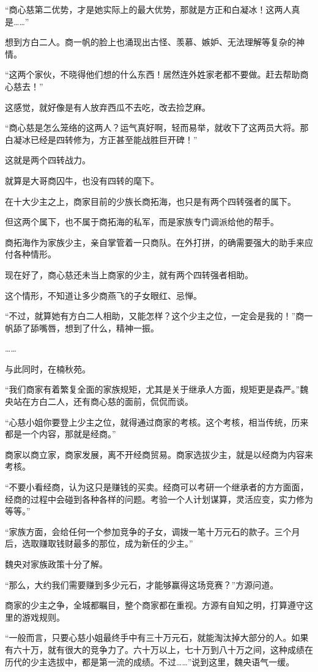 \begin{this_body}
“商心慈第二优势，才是她实际上的最大优势，那就是方正和白凝冰！这两人真是……”

想到方白二人。商一帆的脸上也涌现出古怪、羡慕、嫉妒、无法理解等复杂的神情。

“这两个家伙，不晓得他们想的什么东西！居然连外姓家老都不要做。赶去帮助商心慈去！”

这感觉，就好像是有人放弃西瓜不去吃，改去捡芝麻。

“商心慈是怎么笼络的这两人？运气真好啊，轻而易举，就收下了这两员大将。那白凝冰已经是四转修为，方正甚至能战胜巨开碑！”

这就是两个四转战力。

就算是大哥商囚牛，也没有四转的麾下。

在十大少主之上，商家目前的少族长商拓海，也只是有两个四转强者的属下。

但这两个属下，也不属于商拓海的私军，而是家族专门调派给他的帮手。

商拓海作为家族少主，亲自掌管着一只商队。在外打拼，的确需要强大的助手来应付各种情形。

现在好了，商心慈还未当上商家的少主，就有两个四转强者相助。

这个情形，不知道让多少商燕飞的子女眼红、忌惮。

“不过，就算她有方白二人相助，又能怎样？这个少主之位，一定会是我的！”商一帆舔了舔嘴唇，想到了什么，精神一振。

……

与此同时，在楠秋苑。

“我们商家有着繁复全面的家族规矩，尤其是关于继承人方面，规矩更是森严。”魏央站在方白二人，还有商心慈的面前，侃侃而谈。

“心慈小姐你要登上少主之位，就得通过商家的考核。这个考核，相当传统，历来都是一个内容，那就是经商。”

商家以商立家，商家发展，离不开经商贸易。商家选拔少主，就是以经商为内容来考核。

“不要小看经商，认为这只是赚钱的买卖。经商可以考研一个继承者的方方面面，经商的过程中会碰到各种各样的问题。考验一个人计划谋算，灵活应变，实力修为等等。”

“家族方面，会给任何一个参加竞争的子女，调拨一笔十万元石的款子。三个月后，选取赚取钱财最多的那位，成为新任的少主。”

魏央对家族政策十分了解。

“那么，大约我们需要赚到多少元石，才能够赢得这场竞赛？”方源问道。

商家的少主之争，全城都瞩目，整个商家都在重视。方源有自知之明，打算遵守这里的游戏规则。

“一般而言，只要心慈小姐最终手中有三十万元石，就能淘汰掉大部分的人。如果有六十万，就有很大的竞争力了。六十万以上，七十万到八十万之间，这种成绩在历代的少主选拔中，都是第一流的成绩。不过……”说到这里，魏央语气一缓。


\end{this_body}
